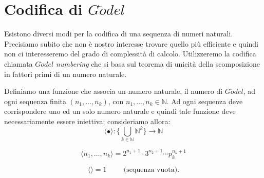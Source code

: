 \section{Codifica di $G\ddot{o}del$}
Esistono diversi modi per la codifica di una sequenza di numeri naturali. Precisiamo subito che non \`e nostro interesse trovare quello pi\`u efficiente e quindi non ci interesseremo del grado di complessit\`a di calcolo. Utilizzeremo la codifica chiamata \emph{$G\ddot{o}del$ numbering} che si basa sul teorema di unicit\`a della scomposizione in fattori primi di un numero naturale.

Definiamo una funzione che associa un numero naturale, il numero di $G\ddot{o}del$, ad ogni sequenza finita $(n_1,\ldots,n_{k})$, con $n_1,\ldots,n_{k}\in \mathbb {N}$. Ad ogni sequenza deve corrispondere uno ed un solo numero naturale e quindi tale funzione deve necessariamente essere iniettiva; consideriamo allora:
\begin{displaymath}
\langle \bullet \rangle : \{\bigcup_{k\in\mathbb{N}} \mathbb{N}^k\} \rightarrow \mathbb{N}
\end{displaymath}

\begin{displaymath}
\langle n_1,\ldots,n_{k} \rangle = 2^{n_1+1} \cdot 3^{n_2+1}\cdots p_{k}^{n_{k}+1}
\end{displaymath}

\begin{displaymath}
\langle \rangle = 1\hspace{1cm}\text{(sequenza vuota).}
\end{displaymath}

